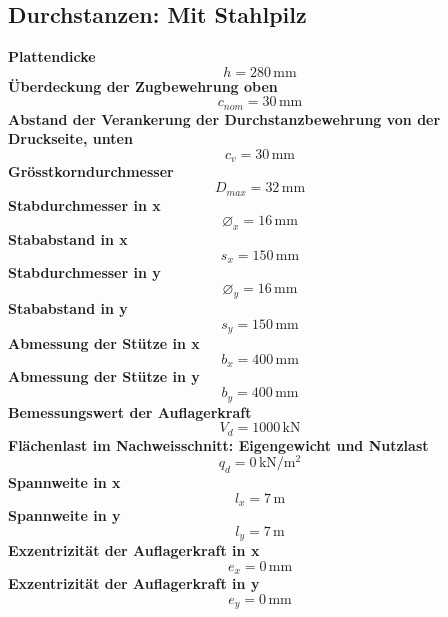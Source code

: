 \documentclass[11pt,a4paper]{article}
\begin{document}
\subsection{Durchstanzen: Mit Stahlpilz}
\noindent\textbf{Plattendicke}
\begin{equation*}
h = 280\,\mathrm{mm}
\end{equation*}
\noindent\textbf{Überdeckung der Zugbewehrung oben}
\begin{equation*}
c_{nom} = 30\,\mathrm{mm}
\end{equation*}
\noindent\textbf{Abstand der Verankerung der Durchstanzbewehrung von der Druckseite, unten}
\begin{equation*}
c_v = 30\,\mathrm{mm}
\end{equation*}
\noindent\textbf{Grösstkorndurchmesser}
\begin{equation*}
D_{max} = 32\,\mathrm{mm}
\end{equation*}
\noindent\textbf{Stabdurchmesser in x}
\begin{equation*}
\varnothing_x = 16\,\mathrm{mm}
\end{equation*}
\noindent\textbf{Stababstand in x}
\begin{equation*}
s_x = 150\,\mathrm{mm}
\end{equation*}
\noindent\textbf{Stabdurchmesser in y}
\begin{equation*}
\varnothing_y = 16\,\mathrm{mm}
\end{equation*}
\noindent\textbf{Stababstand in y}
\begin{equation*}
s_y = 150\,\mathrm{mm}
\end{equation*}
\noindent\textbf{Abmessung der Stütze in x}
\begin{equation*}
b_x = 400\,\mathrm{mm}
\end{equation*}
\noindent\textbf{Abmessung der Stütze in y}
\begin{equation*}
b_y = 400\,\mathrm{mm}
\end{equation*}
\noindent\textbf{Bemessungswert der Auflagerkraft}
\begin{equation*}
V_d = 1000\,\mathrm{kN}
\end{equation*}
\noindent\textbf{Flächenlast im Nachweisschnitt: Eigengewicht und Nutzlast}
\begin{equation*}
q_d = 0\,\mathrm{kN}/\mathrm{m}^{2}
\end{equation*}
\noindent\textbf{Spannweite in x}
\begin{equation*}
l_x = 7\,\mathrm{m}
\end{equation*}
\noindent\textbf{Spannweite in y}
\begin{equation*}
l_y = 7\,\mathrm{m}
\end{equation*}
\noindent\textbf{Exzentrizität der Auflagerkraft in x}
\begin{equation*}
e_x = 0\,\mathrm{mm}
\end{equation*}
\noindent\textbf{Exzentrizität der Auflagerkraft in y}
\begin{equation*}
e_y = 0\,\mathrm{mm}
\end{equation*}
\end{document}
